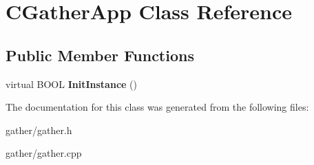\hypertarget{class_c_gather_app}{\section{C\-Gather\-App Class Reference}
\label{class_c_gather_app}
}
\subsection*{Public Member Functions}
\begin{DoxyCompactItemize}
\item 
\hypertarget{class_c_gather_app_adbaeb6065284023afc09238d57275179}{virtual B\-O\-O\-L {\bfseries Init\-Instance} ()}\label{class_c_gather_app_adbaeb6065284023afc09238d57275179}

\end{DoxyCompactItemize}


The documentation for this class was generated from the following files\-:\begin{DoxyCompactItemize}
\item 
gather/gather.\-h\item 
gather/gather.\-cpp\end{DoxyCompactItemize}

